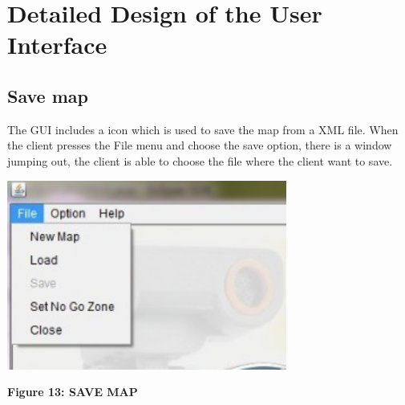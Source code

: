 \documentclass[11pt, a4paper]{report}
\begin{document}
\section{Detailed Design of the User Interface}
\subsection{Save map}
The GUI includes a icon which is used to save the map from a XML file. When the client presses the File menu and choose the save option, there is a window jumping out, the client is able to choose the file where the client want to save.
\begin{center}
 \includegraphics[width=9.20cm]{Menu_file.jpg}
\end{center}
\begin{center}
\textbf {Figure 13: SAVE MAP} \\[0.3cm]
\end{center}
\end{document}
